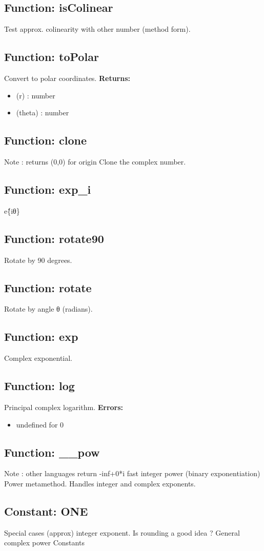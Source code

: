 \documentclass{article}
\begin{document}
\subsection*{Function: isColinear}
Test approx. colinearity with other number (method form).
\hrulefill

\subsection*{Function: toPolar}
Convert to polar coordinates.
\textbf{Returns:}
\begin{itemize}
\item (r) : number
\item (theta) : number
\end{itemize}
\hrulefill

\subsection*{Function: clone}
Note : returns (0,0) for origin Clone the complex number.
\hrulefill

\subsection*{Function: exp\_i}
e\^\{iθ\}
\hrulefill

\subsection*{Function: rotate90}
Rotate by 90 degrees.
\hrulefill

\subsection*{Function: rotate}
Rotate by angle θ (radians).
\hrulefill

\subsection*{Function: exp}
Complex exponential.
\hrulefill

\subsection*{Function: log}
Principal complex logarithm.
\textbf{Errors:}
\begin{itemize}
\item undefined for 0
\end{itemize}
\hrulefill

\subsection*{Function: \_\_pow}
Note : other languages return -inf+0*i fast integer power (binary exponentiation) Power metamethod. Handles integer and complex exponents.
\hrulefill

\subsection*{Constant: ONE}
Special cases (approx) integer exponent. Is rounding a good idea ? General complex power  Constants 
\hrulefill
\end{document}

